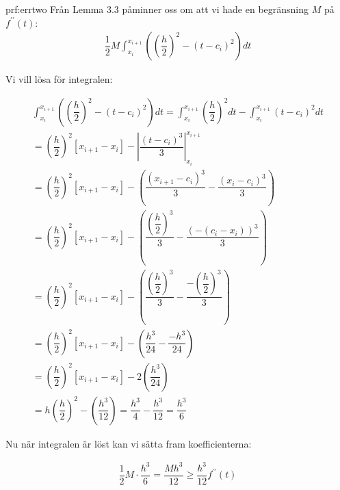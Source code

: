  \begin{prf}{prf:errtwo}
  \noindent Från Lemma 3.3 påminner oss om att vi hade en begränsning $M$ på $f^{\prime\prime}(t)$:
   \begin{equation*}
     \begin{gathered}
       \dfrac{1}{2}M\int_{x_i}^{x_{i+1}}\left(\left(\dfrac{h}{2}\right)^2-(t-c_i)^2\right)dt
     \end{gathered}
   \end{equation*}
   \par\bigskip
   \noindent Vi vill lösa för integralen:

   \begin{equation*}
     \begin{gathered}
       \int_{x_i}^{x_{i+1}}\left(\left(\dfrac{h}{2}\right)^2-(t-c_i)^2\right)dt = \int_{x_i}^{x_{i+1}}\left(\dfrac{h}{2}\right)^2dt-\int_{x_i}^{x_{i+1}}(t-c_i)^2dt\\
       = \left(\dfrac{h}{2}\right)^2\left[x_{i+1}-x_{i}\right]-\left|\dfrac{(t-c_i)^3}{3}\right|_{x_i}^{x_{i+1}}\\
       = \left(\dfrac{h}{2}\right)^2\left[x_{i+1}-x_i\right]-\left(\dfrac{(x_{i+1}-c_i)^3}{3}-\dfrac{(x_i-c_i)^3}{3}\right)\\
       = \left(\dfrac{h}{2}\right)^2\left[x_{i+1}-x_i\right]-\left(\dfrac{\left(\dfrac{h}{2}\right)^3}{3}-\dfrac{(-(c_i-x_i))^3}{3}\right)\\
       = \left(\dfrac{h}{2}\right)^2\left[x_{i+1}-x_i\right]-\left(\dfrac{\left(\dfrac{h}{2}\right)^3}{3}-\dfrac{-\left(\dfrac{h}{2}\right)^3}{3}\right)\\
       = \left(\dfrac{h}{2}\right)^2\left[x_{i+1}-x_i\right]-\left(\dfrac{h^3}{24}-\dfrac{-h^3}{24}\right)\\
       = \left(\dfrac{h}{2}\right)^2\left[x_{i+1}-x_i\right]-2\left(\dfrac{h^3}{24}\right)\\
       = h\left(\dfrac{h}{2}\right)^2-\left(\dfrac{h^3}{12}\right) = \dfrac{h^3}{4}-\dfrac{h^3}{12} = \dfrac{h^3}{6}
     \end{gathered}
   \end{equation*}
   \par\bigskip
   \noindent Nu när integralen är löst kan vi sätta fram koefficienterna:


   \begin{equation*}
     \begin{gathered}
       \dfrac{1}{2}M\cdot\dfrac{h^3}{6} = \dfrac{Mh^3}{12}\geq\dfrac{h^3}{12}f^{\prime\prime}(t)
     \end{gathered}
   \end{equation*}
\end{prf}




































